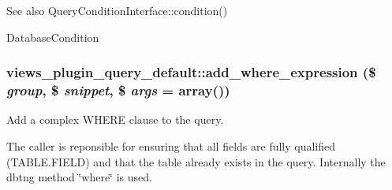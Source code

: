 \begin{DoxySeeAlso}{See also}
QueryConditionInterface::condition() 

DatabaseCondition 
\end{DoxySeeAlso}
\hypertarget{classviews__plugin__query__default_ae44670637e83514a8fc472190397e51d}{
\subsubsection[{add\_\-where\_\-expression}]{\setlength{\rightskip}{0pt plus 5cm}views\_\-plugin\_\-query\_\-default::add\_\-where\_\-expression (\$ {\em group}, \/  \$ {\em snippet}, \/  \$ {\em args} = {\ttfamily array()})}}
\label{classviews__plugin__query__default_ae44670637e83514a8fc472190397e51d}
Add a complex WHERE clause to the query.

The caller is reponsible for ensuring that all fields are fully qualified (TABLE.FIELD) and that the table already exists in the query. Internally the dbtng method \char`\"{}where\char`\"{} is used.


